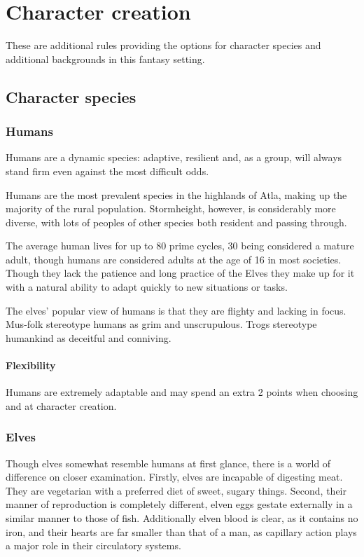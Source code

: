 \documentclass[a4paper,11pt,oneside]{book}
\newcommand{\textlf}[1]{\textbf{\titlecap{#1}}}
\begin{document}
\chapter{Character creation}
These are additional rules providing the options for character species and additional backgrounds in this fantasy setting.

\section{Character species}

\subsection{Humans}
Humans are a dynamic species: adaptive, resilient and, as a group, will always stand firm even against the most difficult odds.

Humans are the most prevalent species in the highlands of Atla, making up the majority of the rural population. Stormheight, however, is considerably more diverse, with lots of peoples of other species both resident and passing through.

The average human lives for up to 80 prime cycles, 30 being considered a mature adult, though humans are considered adults at the age of 16 in most societies. Though they lack the patience and long practice of the Elves they make up for it with a natural ability to adapt quickly to new situations or tasks. 

The elves' popular view of humans is that they are flighty and lacking in focus. Mus-folk stereotype humans as grim and unscrupulous. Trogs stereotype humankind as deceitful and conniving.  

\subsubsection*{Flexibility}
Humans are extremely adaptable and may spend an extra 2 points when choosing \textlf{perks} and \textlf{proficiencies} at character creation.


\subsection{Elves}
Though elves somewhat resemble humans at first glance, there is a world of difference on closer examination. Firstly, elves are incapable of digesting meat. They are vegetarian with a preferred diet of sweet, sugary things. Second, their manner of reproduction is completely different, elven eggs gestate externally in a similar manner to those of fish. Additionally elven blood is clear, as it contains no iron, and their hearts are far smaller than that of a man, as capillary action plays a major role in their circulatory systems.
\end{document}
